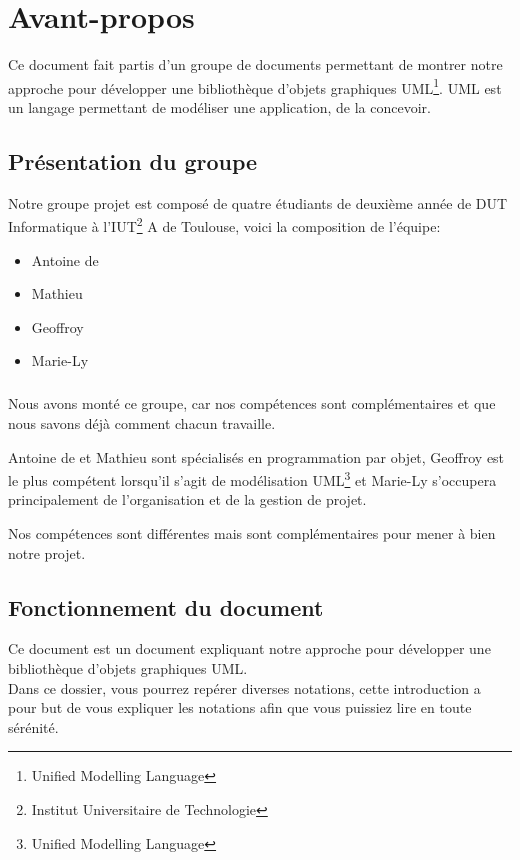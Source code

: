\chapter*{Avant-propos}
Ce document fait partis d'un groupe de documents permettant de montrer notre approche pour développer une bibliothèque d'objets graphiques 
UML\footnote{Unified Modelling Language}. UML est un langage permettant de modéliser une application, de la concevoir. 

\section*{Présentation du groupe}
	Notre groupe projet est composé de quatre étudiants de deuxième année de DUT Informatique à l'IUT\footnote{Institut Universitaire de Technologie} A de Toulouse, voici la composition de l'équipe: 
	\begin{itemize}
		\item Antoine de  
		\item Mathieu  
		\item Geoffroy 
		\item Marie-Ly  
	\end{itemize}
	\vspace{20px}
	\paragraph{}
	Nous avons monté ce groupe, car nos compétences sont complémentaires et que nous savons déjà comment chacun travaille.
	
	Antoine de  et Mathieu  sont spécialisés en programmation par objet, Geoffroy  est le plus compétent lorsqu'il s'agit de modélisation UML\footnote{Unified Modelling Language} et Marie-Ly  s'occupera principalement de l'organisation et de la gestion de projet. 

	Nos compétences sont différentes mais sont complémentaires pour mener à bien notre projet.
\section*{Fonctionnement du document}
Ce document est un document expliquant notre approche pour développer une bibliothèque d'objets graphiques UML.\\

Dans ce dossier, vous pourrez repérer diverses notations, cette introduction a pour but de vous expliquer les notations afin
que vous puissiez lire en toute sérénité.
